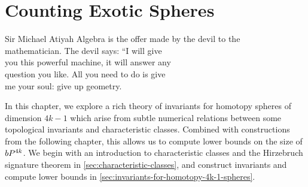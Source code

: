 \chapter{Counting Exotic Spheres}\label{chap:invariants}
%
%

\begin{epigraph}{20em}{Sir Michael Atiyah}
	Algebra is the offer made by the devil to the \\
	mathematician. The devil says: ``I will give \\
	you this powerful machine, it will answer any \\
	question you like. All you need to do is give\\
	me your soul: give up geometry.
\end{epigraph}

In this chapter, we explore a rich theory of invariants for homotopy spheres of dimension $4k-1$ which arise from subtle numerical relations between some topological invariants and characteristic classes. Combined with constructions from the following chapter, this allows us to compute lower bounds on the size of $bP^{4k}$. We begin with an introduction to characteristic classes and the Hirzebruch signature theorem in \cref{sec:characteristic-classes}, and construct invariants and compute lower bounds in \cref{sec:invariants-for-homotopy-4k-1-spheres}.



